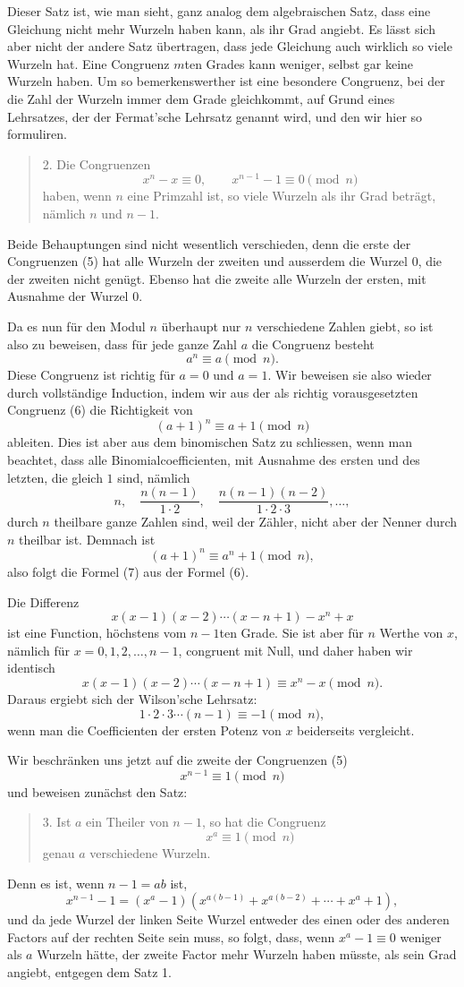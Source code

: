 \documentclass[11pt]{article}
\begin{document}
Dieser Satz ist, wie man sieht, ganz analog dem algebraischen Satz, dass eine Gleichung nicht mehr Wurzeln haben kann, als ihr Grad angiebt. Es lässt sich aber nicht der andere Satz übertragen, dass jede Gleichung auch wirklich so viele Wurzeln hat. Eine Congruenz $m$ten Grades kann weniger, selbst gar keine Wurzeln haben. Um so bemerkenswerther ist eine besondere Congruenz, bei der die Zahl der Wurzeln immer dem Grade gleichkommt, auf Grund eines Lehrsatzes, der der Fermat'sche Lehrsatz genannt wird, und den wir hier so formuliren.
\begin{quote}
2. Die Congruenzen
\[
\tag{5}        x^n-x\equiv0,\qquad x^{n-1}-1\equiv0\pmod n
\]
haben, wenn $n$ eine Primzahl ist, so viele Wurzeln als ihr Grad beträgt, nämlich $n$ und $n-1$.
\end{quote}
Beide Behauptungen sind nicht wesentlich verschieden, denn die erste der Congruenzen (5) hat alle Wurzeln der zweiten und ausserdem die Wurzel $0$, die der zweiten nicht genügt. Ebenso hat die zweite alle Wurzeln der ersten, mit Ausnahme der Wurzel $0$.

Da es nun für den Modul $n$ überhaupt nur $n$ verschiedene Zahlen giebt, so ist also zu beweisen, dass für jede ganze Zahl $a$ die Congruenz besteht
\[
\tag{6}        a^n\equiv a\pmod n.
\]
Diese Congruenz ist richtig für $a=0$ und $a=1$. Wir beweisen sie also wieder durch vollständige Induction, indem wir aus der als richtig vorausgesetzten Congruenz (6) die Richtigkeit von
\[
\tag{7}        (a+1)^n\equiv a+1\pmod n
\]
ableiten. Dies ist aber aus dem binomischen Satz zu schliessen, wenn man beachtet, dass alle Binomialcoefficienten, mit Ausnahme des ersten und des letzten, die gleich $1$ sind, nämlich
\[
        n,\quad \frac{n(n-1)}{1\cdot2},\quad \frac{n(n-1)(n-2)}{1\cdot2\cdot3},\ldots,
\]
durch $n$ theilbare ganze Zahlen sind, weil der Zähler, nicht aber der Nenner durch $n$ theilbar ist. Demnach ist
\[
        (a+1)^n\equiv a^n+1\pmod n,
\]
also folgt die Formel (7) aus der Formel (6).

Die Differenz
\[
        x(x-1)(x-2)\cdots(x-n+1)-x^n+x
\]
ist eine Function, höchstens vom $n-1$ten Grade. Sie ist aber für $n$ Werthe von $x$, nämlich für $x=0,1,2,\ldots,n-1$, congruent mit Null, und daher haben wir identisch
\[
        x(x-1)(x-2)\cdots(x-n+1)\equiv x^n-x\pmod n.
\]
Daraus ergiebt sich der Wilson'sche Lehrsatz:
\[
        1\cdot2\cdot3\cdots(n-1)\equiv-1\pmod n,
\]
wenn man die Coefficienten der ersten Potenz von $x$ beiderseits vergleicht.

Wir beschränken uns jetzt auf die zweite der Congruenzen (5)
\[
\tag{8}        x^{n-1}\equiv1\pmod n
\]
und beweisen zunächst den Satz:
\begin{quote}
3. Ist $a$ ein Theiler von $n-1$, so hat die Congruenz
\[
\tag{9}        x^a\equiv1\pmod n
\]
genau $a$ verschiedene Wurzeln.
\end{quote}
Denn es ist, wenn $n-1=ab$ ist,
\[
        x^{n-1}-1=(x^a-1)(x^{a(b-1)}+x^{a(b-2)}+\cdots+x^a+1),
\]
und da jede Wurzel der linken Seite Wurzel entweder des einen oder des anderen Factors auf der rechten Seite sein muss, so folgt, dass, wenn $x^a-1\equiv0$ weniger als $a$ Wurzeln hätte, der zweite Factor mehr Wurzeln haben müsste, als sein Grad angiebt, entgegen dem Satz 1.
\end{document}
